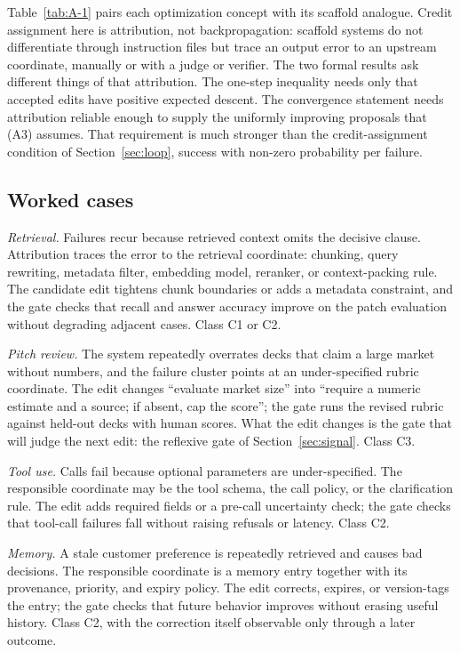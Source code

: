 Table~\ref{tab:A-1} pairs each optimization concept with its scaffold analogue. Credit assignment here is attribution, not backpropagation: scaffold systems do not differentiate through instruction files but trace an output error to an upstream coordinate, manually or with a judge or verifier. The two formal results ask different things of that attribution. The one-step inequality needs only that accepted edits have positive expected descent. The convergence statement needs attribution reliable enough to supply the uniformly improving proposals that (A3) assumes. That requirement is much stronger than the credit-assignment condition of Section~\ref{sec:loop}, success with non-zero probability per failure.

\subsection{Worked cases}\label{worked-cases}

\emph{Retrieval.} Failures recur because retrieved context omits the decisive clause. Attribution traces the error to the retrieval coordinate: chunking, query rewriting, metadata filter, embedding model, reranker, or context-packing rule. The candidate edit tightens chunk boundaries or adds a metadata constraint, and the gate checks that recall and answer accuracy improve on the patch evaluation without degrading adjacent cases. Class C1 or C2.

\emph{Pitch review.} The system repeatedly overrates decks that claim a large market without numbers, and the failure cluster points at an under-specified rubric coordinate. The edit changes ``evaluate market size'' into ``require a numeric estimate and a source; if absent, cap the score''; the gate runs the revised rubric against held-out decks with human scores. What the edit changes is the gate that will judge the next edit: the reflexive gate of Section~\ref{sec:signal}. Class C3.

\emph{Tool use.} Calls fail because optional parameters are under-specified. The responsible coordinate may be the tool schema, the call policy, or the clarification rule. The edit adds required fields or a pre-call uncertainty check; the gate checks that tool-call failures fall without raising refusals or latency. Class C2.

\emph{Memory.} A stale customer preference is repeatedly retrieved and causes bad decisions. The responsible coordinate is a memory entry together with its provenance, priority, and expiry policy. The edit corrects, expires, or version-tags the entry; the gate checks that future behavior improves without erasing useful history. Class C2, with the correction itself observable only through a later outcome.

